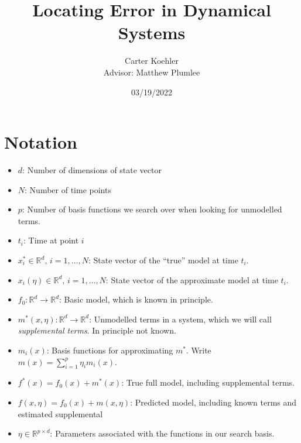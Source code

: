 \documentclass[12pt]{article}
\author{Carter Koehler\\{\small Advisor: Matthew Plumlee}}
\title{Locating Error in Dynamical Systems}
\date{03/19/2022}
\begin{document}
\maketitle



\begin{abstract}
  
\end{abstract}


\section{Notation}

\begin{itemize}

\item
  $d$: Number of dimensions of state vector

\item
  $N$: Number of time points

\item
  $p$: Number of basis functions we search over when looking for unmodelled terms.

\item
  $t_i$: Time at point $i$
  
\item
  $x_i^* \in \mathbb{R}^d,\, i=1,\ldots, N$: State vector of the ``true'' model at time $t_i$. 

\item
  $x_i(\eta) \in \mathbb{R}^d,\, i=1,\ldots, N$: State vector of the approximate model at time $t_i$. 
  
\item
  $f_0: \mathbb{R}^d \to \mathbb{R}^d$: Basic model, which is known in principle.

\item
  $m^*(x, \eta): \mathbb{R}^d \to \mathbb{R}^d$: Unmodelled terms in a system, which we will call \textit{supplemental terms}. In principle not known.

\item
  $m_i(x)$: Basis functions for approximating $m^*$. Write $m(x) = \sum_{i=1}^{p} \eta_i m_i(x)$.

\item
  $f^*(x) = f_0(x) + m^*(x)$: True full model, including supplemental terms.

\item
  $f(x, \eta) = f_0(x) + m(x, \eta)$: Predicted model, including known terms and estimated supplemental  
  
\item
  $\eta \in \mathbb{R}^{p \times d}$: Parameters associated with the functions in our search basis.

\end{itemize}
\end{document}

